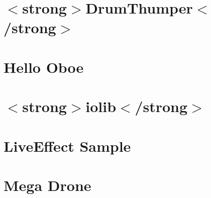 \let\mypdfximage\pdfximage\def\pdfximage{\immediate\mypdfximage}\documentclass[twoside]{book}
\newcommand{\+}{\discretionary{\mbox{\scriptsize$\hookleftarrow$}}{}{}}
\begin{document}
\chapter{$<$strong$>$Drum\+Thumper$<$/strong$>$}
\label{md__c_1__users_fab_src__github_branches__neural_amp_modeler_plugin_i_plug2__dependencies__build_9a9326baa52279244e745ecb31c7ef26}

\chapter{Hello Oboe}
\label{md__c_1__users_fab_src__github_branches__neural_amp_modeler_plugin_i_plug2__dependencies__build_f42b5cdde8aa03ae86dc8dc40a4acaf4}

\chapter{$<$strong$>$iolib$<$/strong$>$}
\label{md__c_1__users_fab_src__github_branches__neural_amp_modeler_plugin_i_plug2__dependencies__build_7a2517a88ca6a16764c2409a560741c7}

\chapter{Live\+Effect Sample}
\label{md__c_1__users_fab_src__github_branches__neural_amp_modeler_plugin_i_plug2__dependencies__build_0e0ca921083f43d561227609276b7b45}

\chapter{Mega Drone}
\label{md__c_1__users_fab_src__github_branches__neural_amp_modeler_plugin_i_plug2__dependencies__build_d97e7ec3233f8be96a19dab80500372d}

\end{document}
